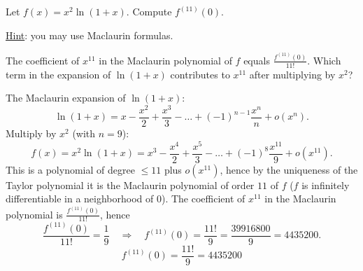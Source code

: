 
\begin{question}
Let $f(x)=x^2\ln(1+x)$. Compute $f^{(11)}(0)$.

\underline{Hint}: you may use Maclaurin formulas.
\end{question}

\begin{hint}
The coefficient of $x^{11}$ in the Maclaurin polynomial of $f$ equals $\frac{f^{(11)}(0)}{11!}$. Which term in the expansion of $\ln(1+x)$ contributes to $x^{11}$ after multiplying by $x^2$?
\end{hint}

\begin{solution}
The Maclaurin expansion of $\ln(1+x)$:
\[ \ln(1+x)=x-\frac{x^2}{2}+\frac{x^3}{3}-\dots+(-1)^{n-1}\frac{x^n}{n}+o(x^n). \]
Multiply by $x^2$ (with $n=9$):
\[ f(x)=x^2\ln(1+x)=x^3-\frac{x^4}{2}+\frac{x^5}{3}-\dots+(-1)^{8}\frac{x^{11}}{9}+o(x^{11}). \]
This is a polynomial of degree $\le 11$ plus $o(x^{11})$, hence by the uniqueness of the Taylor polynomial it is the Maclaurin polynomial of order $11$ of $f$ ($f$ is infinitely differentiable in a neighborhood of $0$). The coefficient of $x^{11}$ in the Maclaurin polynomial is $\frac{f^{(11)}(0)}{11!}$, hence
\[ \frac{f^{(11)}(0)}{11!}=\frac19\quad\Longrightarrow\quad f^{(11)}(0)=\frac{11!}{9}=\frac{39916800}{9}=4435200. \]
\[ \boxed{f^{(11)}(0)=\frac{11!}{9}=4435200} \]
\end{solution}
